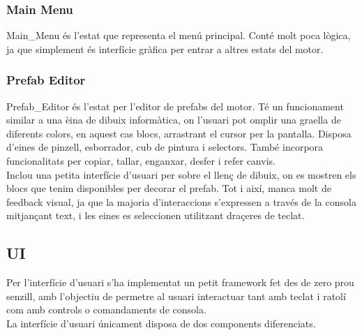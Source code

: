 \subsubsection{Main Menu}
Main\_Menu és l'estat que representa el menú principal. Conté molt poca lògica, ja que simplement és interfície gràfica per entrar a altres estats del motor.

\subsubsection{Prefab Editor}
Prefab\_Editor és l'estat per l'editor de prefabs del motor. Té un funcionament similar a una èina de dibuix informàtica, on l'usuari pot omplir una graella de diferents colors, en aquest cas blocs, arrastrant el cursor per la pantalla.
Disposa d'eines de pinzell, esborrador, cub de pintura i selectors. També incorpora funcionalitats per copiar, tallar, enganxar, desfer i refer canvis.
\\
Inclou una petita interfície d'usuari per sobre el llenç de dibuix, on es mostren els blocs que tenim disponibles per decorar el prefab. Tot i així, manca molt de feedback visual, ja que la majoria d'interaccions s'expressen a través de la consola mitjançant text, i les eines es seleccionen utilitzant draçeres de teclat.

\subsection{UI}
Per l'interfície d'usuari s'ha implementat un petit framework fet des de zero prou senzill, amb l'objectiu de permetre al usuari interactuar tant amb teclat i ratolí com amb controls o comandaments de consola.
\\
La interfície d'usuari únicament disposa de dos components diferenciats.

